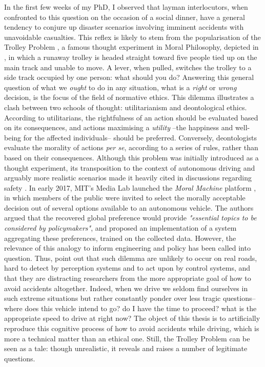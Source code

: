 In the first few weeks of my PhD, I observed that layman interlocutors, when confronted to this question on the occasion of a social dinner, have a general tendency to conjure up disaster scenarios involving imminent accidents with unavoidable casualties. This reflex is likely to stem from the popularisation of the Trolley Problem \citep{Foot1967}, a famous thought experiment in Moral Philosophy, depicted in , in which a runaway trolley is headed straight toward five people tied up on the main track and unable to move. A lever, when pulled, switches the trolley to a side track occupied by one person: what should you do? Answering this general question of what we \emph{ought} to do in any situation, what is a \emph{right} or \emph{wrong} decision, is the focus of the field of {normative ethics}. This dilemma illustrates a clash between two schools of thought: utilitarianism and deontological ethics. According to utilitarians, the rightfulness of an action should be evaluated based on its consequences, and actions maximising a \emph{utility} --the happiness and well-being for the affected individuals-- should be preferred. Conversely, deontologists evaluate the morality of actions \emph{per se}, according to a series of rules, rather than based on their consequences. Although this problem was initially introduced as a thought experiment, its transposition to the context of autonomous driving and arguably more realistic scenarios made it heavily cited in discussions regarding safety \citep[e.g.][]{Lin2015,Bonnefon2016,Gogoll2017}. In early 2017, MIT’s Media Lab launched the \emph{Moral Machine} platform \citep{Awad2018}, in which members of the public were invited to select the morally acceptable decision out of several options available to an autonomous vehicle. The authors argued that the recovered global preference would provide \emph{"essential topics to be considered by policymakers"}, and \citep{Noothigattu2018} proposed an implementation of a system aggregating these preferences, trained on the collected data. However, the relevance of this analogy to inform engineering and policy has been called into question. Thus, \citet{DeFreitas2019} point out that such dilemma are unlikely to occur on real roads, hard to detect by perception systems and to act upon by control systems, and that they are distracting researchers from the more appropriate goal of how to avoid accidents altogether. Indeed, when we drive we seldom find ourselves in such extreme situations but rather constantly ponder over less tragic questions-- where does this vehicle intend to go? do I have the time to proceed? what is the appropriate speed to drive at right now? The object of this thesis is to artificially reproduce this cognitive process of how to avoid accidents while driving, which is more a technical matter than an ethical one. Still, the Trolley Problem can be seen as a tale: though unrealistic, it reveals and raises a number of legitimate questions.
